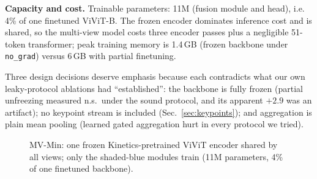 \documentclass[journal]{IEEEtran}
\newcommand{\ie}{i.e.}
\newcommand{\mvmin}{MV-Min}
\begin{document}
\textbf{Capacity and cost.}  Trainable parameters: 11M (fusion module and
head), \ie{} 4\% of one finetuned ViViT-B.  The frozen encoder dominates
inference cost and is shared, so the multi-view model costs three encoder
passes plus a negligible 51-token transformer; peak training memory is
1.4\,GB (frozen backbone under \texttt{no\_grad}) versus 6\,GB with partial
finetuning.

Three design decisions deserve emphasis because each contradicts what our
own leaky-protocol ablations had ``established'': the backbone is fully
frozen (partial unfreezing measured n.s.\ under the sound protocol, and its
apparent $+2.9$ was an artifact); no keypoint stream is included
(Sec.~\ref{sec:keypoints}); and aggregation is plain mean pooling (learned
gated aggregation hurt in every protocol we tried).

\begin{figure}[t]
\centering
{}%
\caption{\mvmin{}: one frozen Kinetics-pretrained ViViT encoder shared by
all views; only the shaded-blue modules train (11M parameters, 4\% of one
finetuned backbone).}
\label{fig:arch}
\end{figure}
\end{document}
